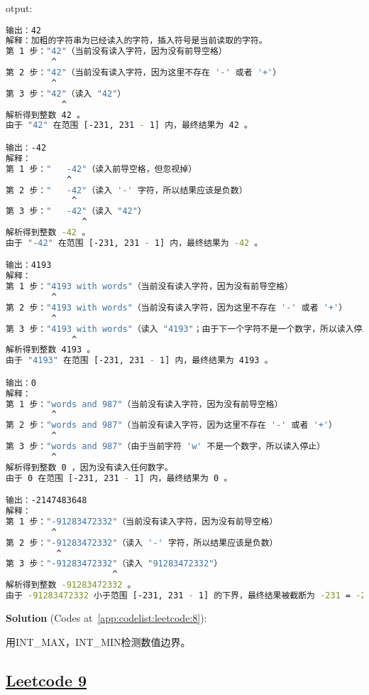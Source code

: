 otput:\par

\begin{lstlisting}[language=bash]
输出：42
解释：加粗的字符串为已经读入的字符，插入符号是当前读取的字符。
第 1 步："42"（当前没有读入字符，因为没有前导空格）
         ^
第 2 步："42"（当前没有读入字符，因为这里不存在 '-' 或者 '+'）
         ^
第 3 步："42"（读入 "42"）
           ^
解析得到整数 42 。
由于 "42" 在范围 [-231, 231 - 1] 内，最终结果为 42 。

输出：-42
解释：
第 1 步："   -42"（读入前导空格，但忽视掉）
            ^
第 2 步："   -42"（读入 '-' 字符，所以结果应该是负数）
             ^
第 3 步："   -42"（读入 "42"）
               ^
解析得到整数 -42 。
由于 "-42" 在范围 [-231, 231 - 1] 内，最终结果为 -42 。

输出：4193
解释：
第 1 步："4193 with words"（当前没有读入字符，因为没有前导空格）
         ^
第 2 步："4193 with words"（当前没有读入字符，因为这里不存在 '-' 或者 '+'）
         ^
第 3 步："4193 with words"（读入 "4193"；由于下一个字符不是一个数字，所以读入停止）
             ^
解析得到整数 4193 。
由于 "4193" 在范围 [-231, 231 - 1] 内，最终结果为 4193 。

输出：0
解释：
第 1 步："words and 987"（当前没有读入字符，因为没有前导空格）
         ^
第 2 步："words and 987"（当前没有读入字符，因为这里不存在 '-' 或者 '+'）
         ^
第 3 步："words and 987"（由于当前字符 'w' 不是一个数字，所以读入停止）
         ^
解析得到整数 0 ，因为没有读入任何数字。
由于 0 在范围 [-231, 231 - 1] 内，最终结果为 0 。

输出：-2147483648
解释：
第 1 步："-91283472332"（当前没有读入字符，因为没有前导空格）
         ^
第 2 步："-91283472332"（读入 '-' 字符，所以结果应该是负数）
          ^
第 3 步："-91283472332"（读入 "91283472332"）
                     ^
解析得到整数 -91283472332 。
由于 -91283472332 小于范围 [-231, 231 - 1] 的下界，最终结果被截断为 -231 = -2147483648 。
\end{lstlisting}

\textbf{Solution }(Codes at~\ref{app:codelist:leetcode:8}):\par

用INT\_MAX，INT\_MIN检测数值边界。\par



\subsection{\href{https://leetcode-cn.com/}{Leetcode 9}}\label{app:problemlist:leetcode:9}

